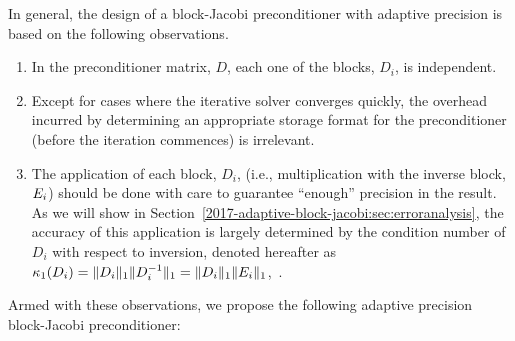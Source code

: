 In general, the design of a block-Jacobi preconditioner with adaptive precision 
is based on
the following observations. 
\begin{enumerate} 
	\item In the preconditioner matrix, $D$, each one of the blocks, $D_i$, is 
	independent. 
	\item Except for cases where the iterative solver converges quickly, 
	the overhead incurred by determining an appropriate 
	storage format for the preconditioner (before the iteration commences) 
	is irrelevant. 
	\item The application of each block, $D_i$,
	(i.e., multiplication with the inverse block, $E_i$)
	should be done with care to guarantee
	``enough'' precision in the result. 
        As we will show in Section~\ref{2017-adaptive-block-jacobi:sec:erroranalysis}, the accuracy of
this application is largely determined by the condition number of $D_i$
with respect to inversion, denoted hereafter as $\kappa_1(D_i) =
\|D_{i}\|_1 \|D_{i}^{-1}\|_1 = \|D_{i}\|_1 \|E_{i}\|_1$,~\cite{GVL3}. 
\end{enumerate} 
Armed with these observations, we propose the following adaptive precision
block-Jacobi preconditioner: 
